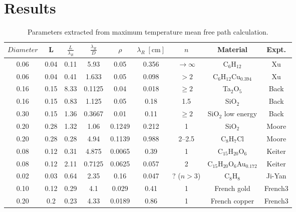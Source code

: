 \documentclass{article}
\begin{document}
\section{Results}
\begin{table}[h!]
\centering
\begin{tabular}{ccccccccc}
\hline
$Diameter$ & L & $\frac{L}{\lambda_R}$ & $\frac{\lambda_R}{D}$ & $\rho$ & $\lambda_R\;[\mathrm{cm}]$ & $n$ & Material & Expt. \\
\hline
0.06 & 0.04 & 0.11 & 5.93 & 0.05   & 0.356 & $\to\infty$ & C$_6$H$_{12}$ & Xu \\
0.06 & 0.04 & 0.41 & 1.633 & 0.05   & 0.098 & $>2$        & C$_6$H$_{12}$Cu$_{0.394}$ & Xu \\
0.16 & 0.15 & 8.33 & 0.1125 & 0.04   & 0.018 & $\ge 2$     & Ta$_2$O$_5$ & Back \\
0.16 & 0.15 & 0.83 & 1.125 & 0.05   & 0.18 & 1.5     & SiO$_2$ & Back \\
0.30 & 0.15 & 1.36 & 0.3667 & 0.01   & 0.11 & $\ge 2$     & SiO$_2$ low energy & Back \\
0.20 & 0.28 & 1.32 & 1.06 & 0.1249 & 0.212 & 1           & SiO$_2$ & Moore \\
0.20 & 0.28 & 0.28 & 4.94 & 0.1139 & 0.988 & 2--2.5      & C$_8$H$_7$Cl & Moore \\
0.08 & 0.12 & 0.31 & 4.875 & 0.0065  & 0.39  & 1           & C$_{15}$H$_{20}$O$_6$ & Keiter \\
0.08 & 0.12 & 2.11 & 0.7125 & 0.0625 & 0.057 & 2           & C$_{15}$H$_{20}$O$_6$Au$_{0.172}$ & Keiter \\
0.02 & 0.03 & 0.64 & 2.35 & 0.16   & 0.047 & ? ($n>3$)   & C$_8$H$_8$ & Ji-Yan \\
0.10 & 0.12 & 0.29 & 4.1 & 0.029  & 0.41  & 1           & French gold & French3 \\
0.20 & 0.2 & 0.23 & 4.33 & 0.0189  & 0.86  & 1           & French copper & French3 \\
\hline
\end{tabular}
\caption{Parameters extracted from maximum temperature mean free path calculation.}
\label{tab:macimu depth}
\end{table}
\end{document}
